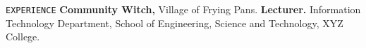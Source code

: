 \begin{rubric}{\faBriefcase\texttt{EXPERIENCE}}
        \textbf{Community Witch,} Village of Frying Pans.
    \entry*[2013 -- 2015]%
        \textbf{Lecturer.} Information Technology Department, School of Engineering, Science and Technology, XYZ College.
    \end{rubric}